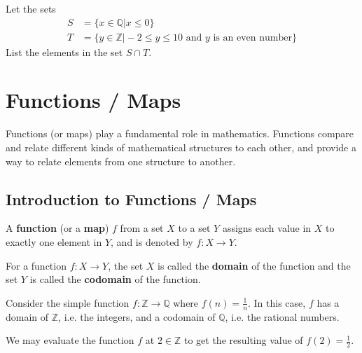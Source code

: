 \begin{exercise}
    Let the sets
    \begin{align*}
        S &= \{x \in \mathbb{Q} \vert x \leq 0\}\\
        T &= \{y \in \mathbb{Z} \vert -2 \leq y \leq 10 \text{ and } y \text{ is an even number} \}
    \end{align*}
    List the elements in the set $S \cap T$.
\end{exercise}

\chapter{Functions / Maps}
Functions (or maps) play a fundamental role in mathematics. Functions compare and relate different kinds of mathematical structures to each other, and provide a way to relate elements from one structure to another.

\section{Introduction to Functions / Maps}
\begin{definition}
    A \textbf{function} (or a \textbf{map}) $f$ from a set $X$ to a set $Y$ assigns each value in $X$ to exactly one element in $Y$, and is denoted by $f: X \to Y$.
\end{definition}
\begin{definition}
    For a function $f: X \to Y$, the set $X$ is called the \textbf{domain} of the function and the set $Y$ is called the \textbf{codomain} of the function.
\end{definition}
\begin{example}
    Consider the simple function $f: \mathbb{Z} \to \mathbb{Q}$ where $f(n) = \frac1n$. In this case, $f$ has a domain of $\mathbb{Z}$, i.e. the integers, and a codomain of $\mathbb{Q}$, i.e. the rational numbers.

    We may evaluate the function $f$ at $2 \in \mathbb{Z}$ to get the resulting value of $f(2) = \frac12$.
\end{example}

